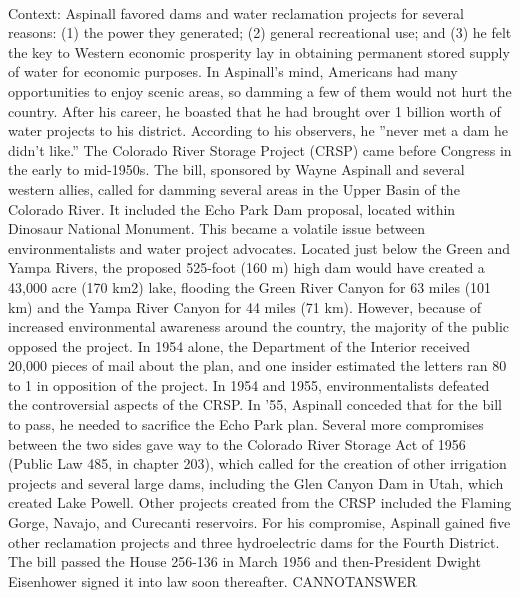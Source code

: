 \documentclass[11pt,a4paper, onecolumn]{article}
\begin{document}
\\ Context: Aspinall favored dams and water reclamation projects for several reasons: (1) the power they generated; (2) general recreational use; and (3) he felt the key to Western economic prosperity lay in obtaining permanent stored supply of water for economic purposes. In Aspinall's mind, Americans had many opportunities to enjoy scenic areas, so damming a few of them would not hurt the country. After his career, he boasted that he had brought over  1 billion worth of water projects to his district. According to his observers, he ''never met a dam he didn't like.'' The Colorado River Storage Project (CRSP) came before Congress in the early to mid-1950s. The bill, sponsored by Wayne Aspinall and several western allies, called for damming several areas in the Upper Basin of the Colorado River. It included the Echo Park Dam proposal, located within Dinosaur National Monument. This became a volatile issue between environmentalists and water project advocates. Located just below the Green and Yampa Rivers, the proposed 525-foot (160 m) high dam would have created a 43,000 acre (170 km2) lake, flooding the Green River Canyon for 63 miles (101 km) and the Yampa River Canyon for 44 miles (71 km). However, because of increased environmental awareness around the country, the majority of the public opposed the project. In 1954 alone, the Department of the Interior received 20,000 pieces of mail about the plan, and one insider estimated the letters ran 80 to 1 in opposition of the project. In 1954 and 1955, environmentalists defeated the controversial aspects of the CRSP. In '55, Aspinall conceded that for the bill to pass, he needed to sacrifice the Echo Park plan. Several more compromises between the two sides gave way to the Colorado River Storage Act of 1956 (Public Law 485, in chapter 203), which called for the creation of other irrigation projects and several large dams, including the Glen Canyon Dam in Utah, which created Lake Powell. Other projects created from the CRSP included the Flaming Gorge, Navajo, and Curecanti reservoirs. For his compromise, Aspinall gained five other reclamation projects and three hydroelectric dams for the Fourth District. The bill passed the House 256-136 in March 1956 and then-President Dwight Eisenhower signed it into law soon thereafter. CANNOTANSWER
\end{document}
